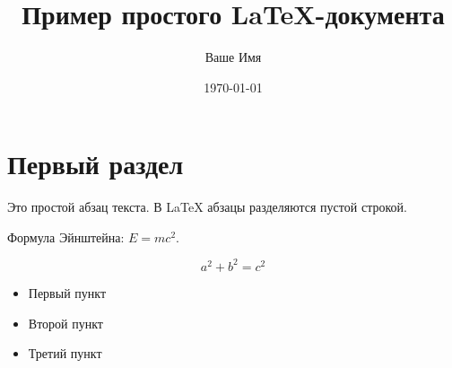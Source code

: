 \documentclass{article} %
\begin{document}
\title{Пример простого \LaTeX-документа}
\author{Ваше Имя}
\date{\today} %
\maketitle    %

\section{Первый раздел} %

Это простой абзац текста. В \LaTeX{} абзацы разделяются пустой строкой.

Формула Эйнштейна: $E = mc^2$.

\begin{equation}
a^2 + b^2 = c^2
\end{equation}

\begin{itemize}
    \item Первый пункт
    \item Второй пункт
    \item Третий пункт
\end{itemize}
\end{document}

